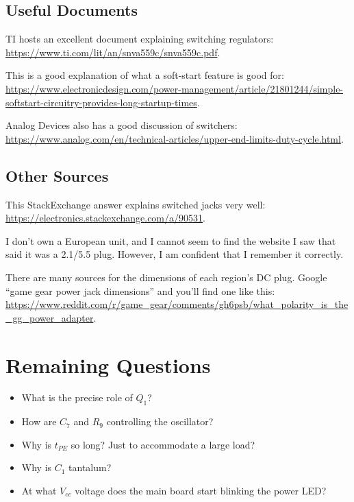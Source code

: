 \documentclass{article}
\newcommand{\Vcc}{$V_{cc}$}
\begin{document}
\subsection{Useful Documents}
TI hosts an excellent document explaining switching regulators:
\url{https://www.ti.com/lit/an/snva559c/snva559c.pdf}.

This is a good explanation of what a soft-start feature is good for:
\url{https://www.electronicdesign.com/power-management/article/21801244/simple-softstart-circuitry-provides-long-startup-times}.

Analog Devices also has a good discussion of switchers:
\url{https://www.analog.com/en/technical-articles/upper-end-limits-duty-cycle.html}.

\subsection{Other Sources}
\label{sec:other_sources}
This Stack\-Ex\-change answer explains switched jacks very well:
\url{https://electronics.stackexchange.com/a/90531}.

I don't own a European unit, and I cannot seem to find the website I
saw that said it was a 2.1/5.5 plug. However, I am confident that I
remember it correctly.

There are many sources for the dimensions of each region's DC
plug. Google ``game gear power jack dimensions'' and you'll find one
like this:
\url{https://www.reddit.com/r/game_gear/comments/gh6psb/what_polarity_is_the_gg_power_adapter}.

\section{Remaining Questions}
\label{sec:remaining_questions}
\begin{itemize}
\item What is the precise role of $Q_1$?
\item How are $C_7$ and $R_9$ controlling the oscillator?
\item Why is $t_{PE}$ so long? Just to accommodate a large load?
\item Why is $C_1$ tantalum?
\item At what \Vcc{} voltage does the main board start blinking the
  power LED?
\end{itemize}
\end{document}
